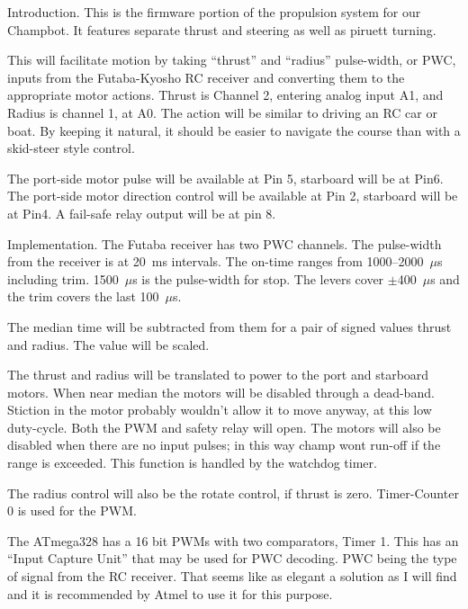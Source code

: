 

%



\nocon %
\datethis %


Introduction. This is the firmware portion of the propulsion system for
our
Champbot.
It features separate thrust and steering as well as piruett turning.

This will facilitate motion by taking ``thrust'' and ``radius'' pulse-width,
or PWC, inputs from the Futaba-Kyosho RC receiver and converting them to the
appropriate motor actions.
Thrust is Channel 2, entering analog input A1, and Radius is channel 1, at A0.
The action will be similar to driving an RC car or boat.
By keeping it natural, it should be easier to navigate the course than with a
skid-steer style control.

The port-side motor pulse will be available at Pin 5, starboard will be at
Pin6. The port-side motor direction control will be available at Pin 2,
starboard will be at Pin4. A fail-safe relay output will be at pin 8.

\fi

Implementation.
The Futaba receiver has two PWC channels.
The pulse-width from the receiver is at 20~ms intervals.
The on-time ranges from 1000--2000~$\mu$s including trim.
1500~$\mu$s is the pulse-width for stop.
The levers cover $\pm$400~$\mu$s and the trim covers the last 100~$\mu$s.

The median time will be subtracted from them for a pair of signed values
thrust and radius. The value will be scaled.

The thrust and radius will be translated to power to the
port and starboard motors.
When near median the motors will be disabled through a dead-band.
Stiction in the motor probably wouldn't allow it to move anyway, at this low
duty-cycle. Both the PWM and safety relay will open.
The motors will also be disabled when there are no input pulses; in this way
champ wont run-off if the range is exceeded. This function is handled by the
watchdog timer.

The radius control will also be the rotate control, if thrust is zero.
Timer-Counter 0 is used for the PWM.

The ATmega328 has a 16 bit PWMs with two comparators, Timer 1.
This has an ``Input Capture Unit'' that may be used for PWC decoding.
PWC being the type of signal from the RC receiver.
That seems like as elegant a solution as I will find and it is recommended by
Atmel to use it for this purpose.

